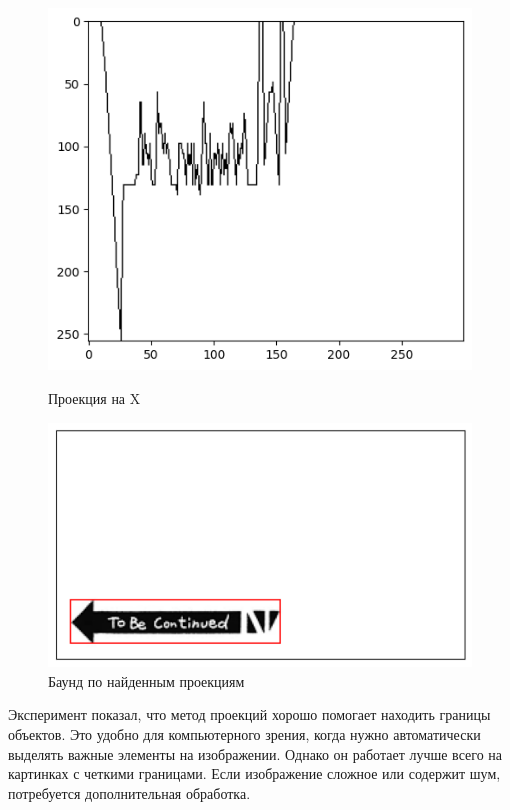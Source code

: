 \documentclass[a4paper,12pt]{article}
\begin{document}
\begin{figure}[H]
\begin{minipage}{0.5\textwidth}
        \centering \includegraphics[width=\textwidth]{images/im_pr_x.png}
        \caption{Проекция на X}
    \end{minipage}\hfill
    \begin{minipage}{0.5\textwidth}
        \centering \includegraphics[width=\textwidth]{images/im_bound.png}
        \caption{Баунд по найденным проекциям}
    \end{minipage}
\end{figure}\noindent

Эксперимент показал, что метод проекций хорошо помогает находить границы объектов. Это удобно для компьютерного зрения, когда нужно автоматически выделять важные элементы на изображении. Однако он работает лучше всего на картинках с четкими границами. Если изображение сложное или содержит шум, потребуется дополнительная обработка.
\end{document}
